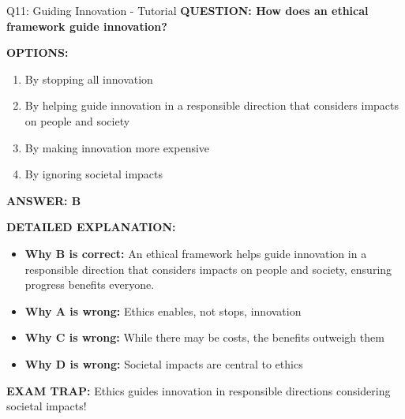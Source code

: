 \documentclass[8pt]{beamer}
\begin{document}
	\begin{frame}{Q11: Guiding Innovation - Tutorial}
		\fontsize{6.5}{7.5}\selectfont
		\textbf{QUESTION: How does an ethical framework guide innovation?}
		
		\vspace{0.1cm}
		\textbf{OPTIONS:}
		\begin{enumerate}
			\item By stopping all innovation
			\item By helping guide innovation in a responsible direction that considers impacts on people and society
			\item By making innovation more expensive
			\item By ignoring societal impacts
		\end{enumerate}
		
		\vspace{0.1cm}
		\textcolor{myblue}{\textbf{ANSWER: B}}
		
		\vspace{0.1cm}
		\textbf{DETAILED EXPLANATION:}
		\begin{itemize}
			\item \textbf{Why B is correct:} An ethical framework helps guide innovation in a responsible direction that considers impacts on people and society, ensuring progress benefits everyone.
			\item \textbf{Why A is wrong:} Ethics enables, not stops, innovation
			\item \textbf{Why C is wrong:} While there may be costs, the benefits outweigh them
			\item \textbf{Why D is wrong:} Societal impacts are central to ethics
		\end{itemize}
		
		\textcolor{myred}{\textbf{EXAM TRAP:}} Ethics guides innovation in \textcolor{myblue}{responsible directions} considering societal impacts!
	\end{frame}
	
\end{document}
